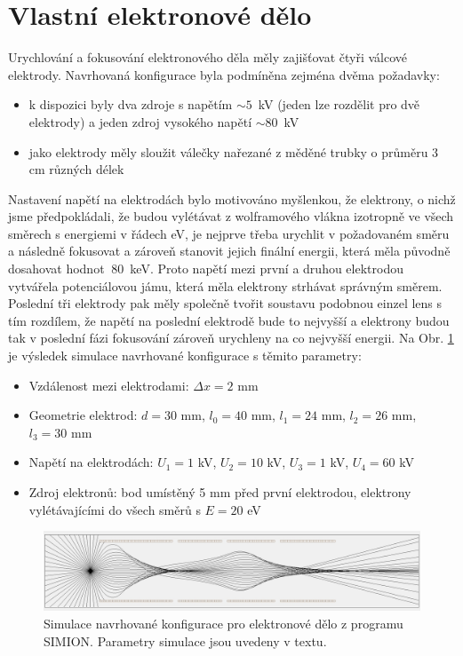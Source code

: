 \section{Vlastní elektronové dělo}

Urychlování a fokusování elektronového děla měly zajišťovat čtyři válcové elektrody. Navrhovaná konfigurace byla podmíněna zejména dvěma požadavky:
\begin{itemize}
	\item k dispozici byly dva zdroje s napětím $\sim 5$~kV (jeden lze rozdělit pro dvě elektrody) a jeden zdroj vysokého napětí $\sim 80$~kV
	\item jako elektrody měly sloužit válečky nařezané z měděné trubky o průměru 3 cm různých délek
\end{itemize}

Nastavení napětí na elektrodách bylo motivováno myšlenkou, že elektrony, o nichž jsme předpokládali, že budou vylétávat z wolframového vlákna izotropně ve všech směrech s energiemi v řádech eV, je nejprve třeba urychlit v požadovaném směru a následně fokusovat a zároveň stanovit jejich finální energii, která měla původně dosahovat hodnot $~80$~keV. Proto napětí mezi první a druhou elektrodou vytvářela potenciálovou jámu, která měla elektrony strhávat správným směrem. Poslední tři elektrody pak měly společně tvořit soustavu podobnou einzel lens s tím rozdílem, že napětí na poslední elektrodě bude to nejvyšší a elektrony budou tak v poslední fázi fokusování zároveň urychleny na co nejvyšší energii. Na Obr. \ref{05simulaceVlastniDelo} je výsledek simulace navrhované konfigurace s těmito parametry:
\begin{itemize}
	\item Vzdálenost mezi elektrodami: $\Delta x = 2$ mm
	\item Geometrie elektrod: $d = 30$ mm, $l_0 = 40$ mm, $l_1 = 24$ mm, $l_2 = 26$ mm, $l_3 = 30$ mm
	\item Napětí na elektrodách: $U_1 = 1$ kV, $U_2 = 10$ kV, $U_3 = 1$ kV, $U_4 = 60$ kV
	\item Zdroj elektronů: bod umístěný 5 mm před první elektrodou, elektrony vylétávajícími do všech směrů s $E = 20$ eV
\end{itemize}

\begin{figure}[htbp!]
\centering
\includegraphics[width = 366 pt]{Figure/05/2a.jpg}
\caption{Simulace navrhované konfigurace pro elektronové dělo z programu SIMION. Parametry simulace jsou uvedeny v textu.}
\label{05simulaceVlastniDelo}
\end{figure}

